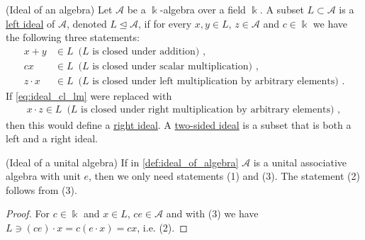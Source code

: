 \begin{definition}{(Ideal of an algebra)}\label{def:ideal_of_algebra}
Let $\mathcal{A}$ be a $\Bbbk$-algebra over a field $\Bbbk$.
A subset $L \subset \mathcal{A}$ is a \ul{left ideal} of $\mathcal{A}$, denoted $L \unlhd \mathcal{A}$, if for every $x, y \in L$,
$z \in \mathcal{A}$ and $c \in \Bbbk$ we have the following three statements:
\begin{align}
x + y &\in L\, \text{ ($L$ is closed under addition) },\label{eq:ideal_cl_add} \\
cx &\in L\, \text{ ($L$ is closed under scalar multiplication) }, \label{eq:ideal_cl_scm} \\
z \cdot x &\in L\, \text{ ($L$ is closed under left multiplication by arbitrary elements) }. \label{eq:ideal_cl_lm}
\end{align}
\noindent If \eqref{eq:ideal_cl_lm} were replaced with
\begin{align}
x \cdot z \in L\, \text{ ($L$ is closed under right multiplication by arbitrary elements) }, \label{eq:ideal_cl_rm}
\end{align}
then this would define a \ul{right ideal}.
A \ul{two-sided ideal} is a subset that is both a left and a right ideal.
\end{definition}

\begin{remark}{(Ideal of a unital algebra)}
If in \ref{def:ideal_of_algebra} $\mathcal{A}$ is a unital associative algebra with unit $e$, then we only need statements
(1) and (3). The statement (2) follows from (3).
\end{remark}
\begin{proof}
For $c \in \Bbbk$ and $x\in L$, $ce \in \mathcal{A}$ and with (3) we have $L \ni (ce)\cdot x = c(e\cdot x) = cx$, i.e. (2).
\end{proof}

